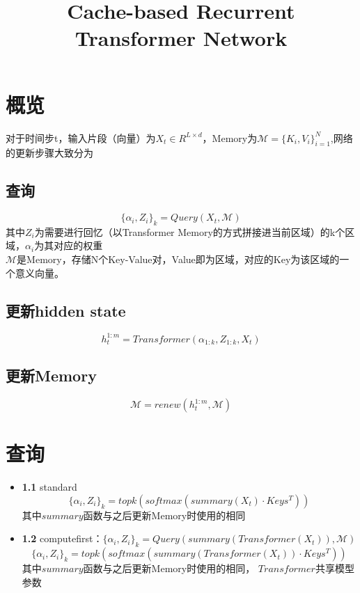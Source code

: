 \documentclass{article}
\title{Cache-based Recurrent Transformer Network} %
\author{%
}
\date{} %
\begin{document}
\maketitle

\section*{概览}
	对于时间步t，输入片段（向量）为$X_t \in R^{L\times d}$，Memory为$\mathcal{M} = \{K_i, V_i\}_{i=1}^N$,网络的更新步骤大致分为
	\subsection*{查询}
		\begin{equation}
			\{\alpha_i, Z_i\}_k = Query(X_t, \mathcal{M})
		\end{equation}
		其中$Z_i$为需要进行回忆（以Transformer Memory的方式拼接进当前区域）的k个区域，$\alpha_i$为其对应的权重\\
		$\mathcal{M}$是Memory，存储N个Key-Value对，Value即为区域，对应的Key为该区域的一个意义向量。
	\subsection*{更新hidden state}
		\begin{equation}
			h_t^{1:m} = Transformer(\alpha_{1:k},Z_{1:k}, X_t)
		\end{equation}
	\subsection*{更新Memory}
		\begin{equation}
			\mathcal{M} = renew(h_t^{1:m}, \mathcal{M})
		\end{equation}
\section{查询}
		\begin{itemize}
			\item \textbf{1.1} standard
			$$\{\alpha_i, Z_i\}_k = topk(softmax(summary(X_t)\cdot Keys^T))$$ 其中$summary$函数与之后更新Memory时使用的相同

		\item \textbf{1.2} computefirst：$\{\alpha_i, Z_i\}_k = Query(summary(Transformer(X_t)) ,\mathcal{M})$
			$$\{\alpha_i, Z_i\}_k = topk(softmax(summary(Transformer(X_t))\cdot Keys^T))$$
			其中$summary$函数与之后更新Memory时使用的相同， $Transformer$共享模型参数
	\end{itemize}
\end{document}
